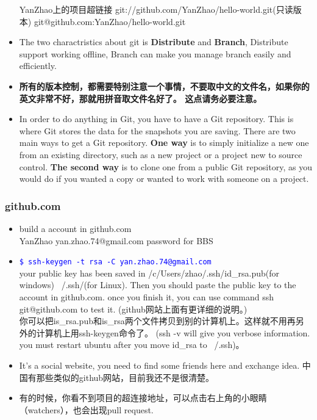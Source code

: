 \documentclass[a4paper,12pt,twoside]{book}
\newcommand{\linuxcommand}[1]{\texttt{\textcolor{blue}{\$ #1 \Pisymbol{psy}{191}}}}
\begin{document}
\begin{CJK*}{UTF8}{song}
\begin{itemize}
YanZhao上的项目超链接
git://github.com/YanZhao/hello-world.git(只读版本) git@github.com:YanZhao/hello-world.git


\item The two charactristics about git is \textbf{Distribute} and \textbf{Branch}, Distribute support working offline, Branch can make you manage branch easily and efficiently.
\item \textbf{所有的版本控制，都需要特别注意一个事情，不要取中文的文件名，如果你的英文非常不好，那就用拼音取文件名好了。 这点请务必要注意。}
\item In order to do anything in Git, you have to have a Git repository. This is where Git stores the data for the snapshots you are saving. There are two main ways to get a Git repository. \textbf{One way} is to simply initialize a new one from an existing directory, such as a new project or a project new to source control. \textbf{The second way} is to clone one from a public Git repository, as you would do if you wanted a copy or wanted to work with someone on a project.
\end{itemize}

\subsubsection{github.com}
\begin{itemize}
	\item build a account in github.com \\
		  YanZhao  yan.zhao.74@gmail.com   password for BBS
	\item \linuxcommand{ssh-keygen -t rsa -C yan.zhao.74@gmail.com} \\
        	your public key has been saved in /c/Users/zhao/.ssh/id\_rsa.pub(for windows) ~/.ssh/(for Linux). Then you should paste the public key to the account in github.com. once you finish it, you can use command ssh git@github.com to test it. (github网站上面有更详细的说明。)\\ 你可以把is\_rsa.pub和is\_rsa两个文件拷贝到别的计算机上。这样就不用再另外的计算机上用ssh-keygen命令了。
         	(ssh -v will give you verbose information. you must restart ubuntu after you move id\_rsa to ~/.ssh)。


	\item It's a social website, you need to find some friends here and exchange idea. 中国有那些类似的github网站，目前我还不是很清楚。

    \item 有的时候，你看不到项目的超连接地址，可以点击右上角的小眼睛（watchers），也会出现pull request.


\end{itemize}
\end{CJK*}
\end{document}
